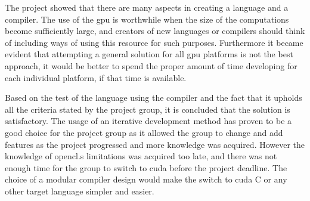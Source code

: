 The project showed that there are many aspects in creating a language and a compiler.
The use of the \acrshort{gpu} is worthwhile when the size of the computations become sufficiently large, and creators of new languages or compilers should think of including ways of using this resource for such purposes.
Furthermore it became evident that attempting a general solution for all \acrshort{gpu} platforms is not the best approach, it would be better to spend the proper amount of time developing for each individual platform, if that time is available.


Based on the test of the language using the compiler and the fact that it upholds all the criteria stated by the project group, it is concluded that the solution is satisfactory.
The usage of an iterative development method has proven to be a good choice for the project group as it allowed the group to change and add features as the project progressed and more knowledge was acquired.
However the knowledge of \gls{opencl}.s limitations was acquired too late, and there was not enough time for the group to switch to \gls{cuda} before the project deadline.
The choice of a modular compiler design would make the switch to \gls{cuda} C or any other target language simpler and easier.